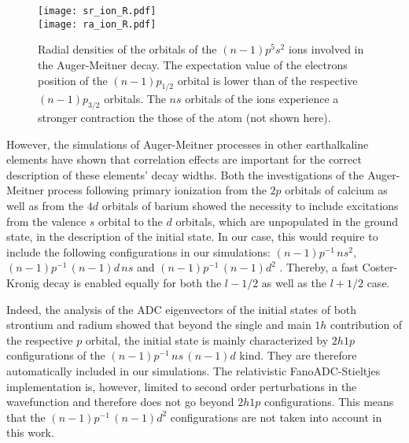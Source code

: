 

\begin{figure}[h]
 \centering
 \texttt{[image: sr\_ion\_R.pdf]}\\
 \texttt{[image: ra\_ion\_R.pdf]}\\
 \caption{Radial densities of the orbitals of the $(n-1)p^5s^2$ ions
          involved in the Auger-Meitner decay.
          The expectation value of the electrons position of the $(n-1)p_{1/2}$
          orbital is lower than of the respective $(n-1)p_{3/2}$
          orbitals. The $ns$ orbitals of the ions experience a stronger
          contraction the those of the atom (not shown here).}
 \label{fig:radial_pure}
\end{figure}

However, the simulations of Auger-Meitner processes in other earthalkaline elements
have shown that correlation effects are important for the correct
description of these elements' decay widths. Both the investigations of
the Auger-Meitner process following primary ionization
from the $2p$ orbitals of calcium \cite{Nikkinen05}
as well as from the $4d$ orbitals of barium \cite{Rose80}
showed the necessity to include excitations from the valence $s$ orbital to
the $d$ orbitals, which are unpopulated in the ground state, in the
description of the initial state.
In our case, this would require to include the following configurations in our
simulations:
 $(n-1)p^{-1} \,ns^2$,
 $(n-1)p^{-1} \,(n-1)d \, ns$ and
 $(n-1)p^{-1} \,(n-1)d^2$ .    
{Thereby, a fast Coster-Kronig decay is enabled equally for both the $l-1/2$ as
well as the $l+1/2$ case.}

Indeed, the analysis of the ADC eigenvectors of the initial states of both
strontium and radium showed
that beyond the single and main $1h$ contribution of the respective $p$ orbital, the
initial state is mainly characterized by $2h1p$ configurations of the
$(n-1)p^{-1} \,ns \, (n-1)d$ kind. They
are therefore automatically included in our simulations.
The
{relativistic}
FanoADC-Stieltjes
{implementation}
is, however, limited
to second order perturbations in the wavefunction
and therefore does not go beyond $2h1p$ configurations. This means that the
$(n-1)p^{-1} \,(n-1)d^2$ configurations are not taken into account in this work.

